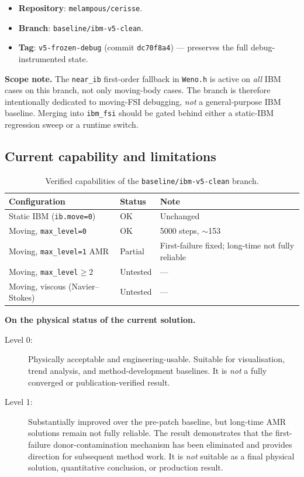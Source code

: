 \begin{itemize}
  \item \textbf{Repository}: \texttt{melampous/cerisse}.
  \item \textbf{Branch}: \texttt{baseline/ibm-v5-clean}.
  \item \textbf{Tag}: \texttt{v5-frozen-debug} (commit
        \texttt{dc70f8a4}) --- preserves the full debug-instrumented state.
\end{itemize}

\textbf{Scope note.} The \texttt{near\_ib} first-order fallback in
\texttt{Weno.h} is active on \emph{all} IBM cases on this branch, not only
moving-body cases. The branch is therefore intentionally dedicated to
moving-FSI debugging, \emph{not} a general-purpose IBM baseline. Merging
into \texttt{ibm\_fsi} should be gated behind either a static-IBM
regression sweep or a runtime switch.

\subsection{Current capability and limitations}

\begin{table}[h]
\centering
\begin{tabular}{lll}
\toprule
Configuration & Status & Note \\
\midrule
Static IBM (\texttt{ib.move=0})              & OK          & Unchanged \\
Moving, \texttt{max\_level=0}                & OK          & 5000 steps, $\sim$153\textdegree{} \\
Moving, \texttt{max\_level=1} AMR            & Partial     & First-failure fixed; long-time not fully reliable \\
Moving, \texttt{max\_level}$\ge 2$           & Untested    & --- \\
Moving, viscous (Navier--Stokes)             & Untested    & --- \\
\bottomrule
\end{tabular}
\caption{Verified capabilities of the \texttt{baseline/ibm-v5-clean} branch.}
\end{table}

\textbf{On the physical status of the current solution.}
\begin{description}
  \item[Level 0:] Physically acceptable and engineering-usable. Suitable for
    visualisation, trend analysis, and method-development baselines. It is
    \emph{not} a fully converged or publication-verified result.
  \item[Level 1:] Substantially improved over the pre-patch baseline, but
    long-time AMR solutions remain not fully reliable. The result
    demonstrates that the first-failure donor-contamination mechanism has
    been eliminated and provides direction for subsequent method work. It
    is \emph{not} suitable as a final physical solution, quantitative
    conclusion, or production result.
\end{description}

